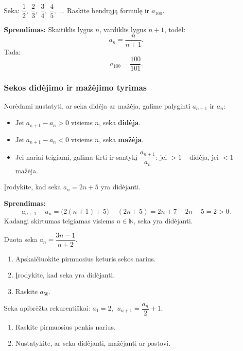 \begin{example}
Seka: $\dfrac{1}{2},\; \dfrac{2}{3},\; \dfrac{3}{4},\; \dfrac{4}{5},\; \ldots$ Raskite bendrąją formulę ir $a_{100}$.

\textbf{Sprendimas:} Skaitiklis lygus $n$, vardiklis lygus $n+1$, todėl:
\[
a_n = \frac{n}{n+1}.
\]
Tada:
\[
a_{100} = \frac{100}{101}.
\]
\end{example}

\subsubsection*{Sekos didėjimo ir mažėjimo tyrimas}

Norėdami nustatyti, ar seka didėja ar mažėja, galime palyginti $a_{n+1}$ ir $a_n$:
\begin{itemize}
    \item Jei $a_{n+1} - a_n > 0$ visiems $n$, seka \textbf{didėja}.
    \item Jei $a_{n+1} - a_n < 0$ visiems $n$, seka \textbf{mažėja}.
    \item Jei nariai teigiami, galima tirti ir santykį $\dfrac{a_{n+1}}{a_n}$: jei $> 1$ – didėja, jei $< 1$ – mažėja.
\end{itemize}

\begin{example}
Įrodykite, kad seka $a_n = 2n + 5$ yra didėjanti.

\textbf{Sprendimas:}
\[
a_{n+1} - a_n = \bigl(2(n+1)+5\bigr) - (2n+5) = 2n + 7 - 2n - 5 = 2 > 0.
\]
Kadangi skirtumas teigiamas visiems $n \in \mathbb{N}$, seka yra didėjanti.
\end{example}

\begin{exercise}
Duota seka $a_n = \dfrac{3n-1}{n+2}$. 
\begin{enumerate}[label=\alph*)]
    \item Apskaičiuokite pirmuosius keturis sekos narius.
    \item Įrodykite, kad seka yra didėjanti.
    \item Raskite $a_{50}$.
\end{enumerate}
\end{exercise}

\begin{exercise}
Seka apibrėžta rekurentiškai: $a_1 = 2$, $\;a_{n+1} = \dfrac{a_n}{2} + 1$.
\begin{enumerate}[label=\alph*)]
    \item Raskite pirmuosius penkis narius.
    \item Nustatykite, ar seka didėjanti, mažėjanti ar pastovi.
\end{enumerate}
\end{exercise}

